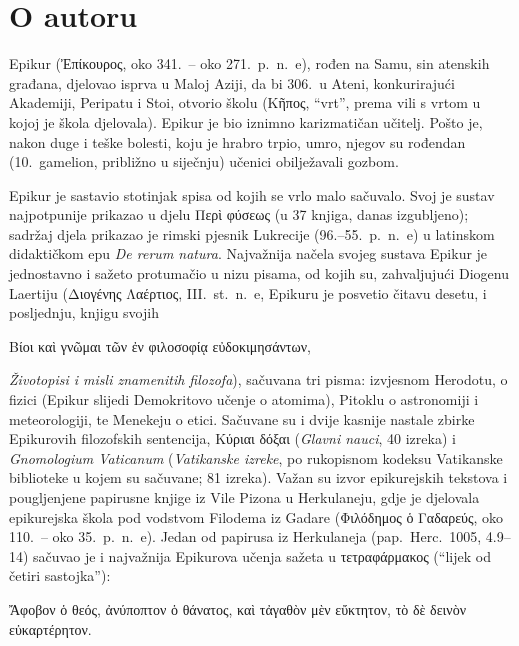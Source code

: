 \section*{O autoru}

Epikur (Ἐπίκουρος, oko 341.\ – oko 271.\ p.~n.~e), rođen na Samu, sin atenskih građana, djelovao isprva u Maloj Aziji, da bi 306.\ u Ateni, konkurirajući Akademiji, Peripatu i Stoi, otvorio školu (Κῆπος, ``vrt'', prema vili s vrtom u kojoj je škola djelovala). Epikur je bio iznimno karizmatičan učitelj. Pošto je, nakon duge i teške bolesti, koju je hrabro trpio, umro, njegov su rođendan (10.\ gamelion, približno u siječnju) učenici obilježavali gozbom.

Epikur je sastavio stotinjak spisa od kojih se vrlo malo sačuvalo. Svoj je sustav najpotpunije prikazao u djelu Περὶ φύσεως (u 37 knjiga, danas izgubljeno); sadržaj djela prikazao je rimski pjesnik Lukrecije (96.–55.\ p.~n.~e) u latinskom didaktičkom epu \textit{De rerum natura}. Najvažnija načela svojeg sustava Epikur je jednostavno i sažeto protumačio u nizu pisama, od kojih su, zahvaljujući Diogenu Laertiju (Διογένης Λαέρτιος, III.\ st.\ n.~e, Epikuru je posvetio čitavu desetu, i posljednju, knjigu svojih \begin{greek}Βίοι καὶ γνῶμαι τῶν ἐν φιλοσοφίᾳ εὐδοκιμησάντων,\end{greek} \textit{Životopisi i misli znamenitih filozofa}), sačuvana tri pisma: izvjesnom Herodotu, o fizici (Epikur slijedi Demokritovo učenje o atomima), Pitoklu o astronomiji i meteorologiji, te Menekeju o etici. Sačuvane su i dvije kasnije nastale zbirke Epikurovih filozofskih sentencija, Κύριαι δόξαι (\textit{Glavni nauci}, 40 izreka) i \textit{Gnomologium Vaticanum} (\textit{Vatikanske izreke}, po rukopisnom kodeksu Vatikanske biblioteke u kojem su sačuvane; 81 izreka). Važan su izvor epikurejskih tekstova i pougljenjene papirusne knjige iz Vile Pizona u Herkulaneju, gdje je djelovala epikurejska škola pod vodstvom Filodema iz Gadare (Φιλόδημος ὁ Γαδαρεύς, oko 110.\ – oko 35.\ p.~n.~e). Jedan od papirusa iz Herkulaneja (pap.\ Herc.\ 1005, 4.9–14) sačuvao je i najvažnija Epikurova učenja sažeta u τετραφάρμακος (``lijek od četiri sastojka''): \begin{greek}Ἄφοβον ὁ θεός, ἀνύποπτον ὁ θάνατος, καὶ τἀγαθὸν μὲν εὔκτητον, τὸ δὲ δεινὸν εὐκαρτέρητον.\end{greek}

